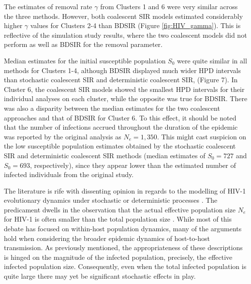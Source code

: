 \documentclass[12pt,titlepage]{article}
\newcommand{\St}{\mathcal{S}}
\newcommand{\It}{\mathcal{I}}
\newcommand{\stochCoalSIR}{stochastic coalescent SIR}
\newcommand{\deterCoalSIR}{deterministic coalescent SIR}
\newcommand{\BDSIR}{BDSIR}
\begin{document}
The estimates of removal rate $\gamma$ 
from Clusters 1 and 6 were very similar across the three methods.  However, both coalescent SIR
models estimated considerably higher $\gamma$ values for Clusters 2-4 than BDSIR (Figure \ref{fig:HIV_gamma}).  This is reflective of the simulation study results, where the two coalescent models 
did not perform as well as BDSIR for the removal parameter.

Median estimates for the initial susceptible population $S_0$ were quite similar in all methods for Clusters 1-4, although \BDSIR{} displayed much wider HPD intervals than \stochCoalSIR{} and \deterCoalSIR{}, (Figure 7).
In Cluster 6, the coalescent SIR models showed the smallest HPD intervals for their individual analyses on each cluster, while the opposite was true for \BDSIR{}.  
There was also a disparity between the median estimates for the two coalescent approaches and that of \BDSIR{} for Cluster 6. 
To this effect, it should be noted that the 
number of infections accrued throughout the duration of the epidemic was reported by the original analysis \citep{Hue:2005} as $N_{e}=1,350$.  %
This might cast suspicion on the low susceptible population estimates obtained by the \stochCoalSIR{} and 
\deterCoalSIR{} methods (median estimates of $S_{0}=727$ and $S_{0}=693$, respectively), since they appear lower than the estimated number of infected individuals from the original study.



The literature is rife with dissenting opinion in regards to the modelling of HIV-1 evolutionary dynamics under stochastic or deterministic processes \citep{Nijhuis:1998,Rouzine:1999,Achaz:2004,Shriner:2004}.
The predicament dwells in the observation that the actual effective population size $N_e$ for HIV-1 is often smaller 
than the total population size \citep{Kouyos:2006}.
While most of this debate has focused on within-host population dynamics, many of the arguments hold when considering the broader epidemic dynamics of host-to-host transmission.
As previously mentioned, the  appropriateness of these descriptions is hinged on the magnitude of the infected population, precisely, the effective infected population size. Consequently, even when the total infected population is quite large there may yet be significant stochastic effects in play.
\end{document}
